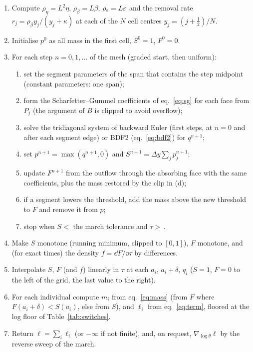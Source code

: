 \begin{enumerate}[leftmargin=2em,itemsep=1pt]
  \item Compute $\rho_\eta=L^2\eta$, $\rho_\beta=L\beta$, $\rho_\varepsilon=L\varepsilon$ and the removal rate $r_j=\rho_\beta y_j/(y_j+\kappa)$ at each of the $N$ cell centres $y_j=(j+\tfrac12)/N$.
  \item Initialise $p^0$ as all mass in the first cell, $S^0=1$, $F^0=0$.
  \item For each step $n=0,1,\dots$ of the mesh (graded start, then uniform):
  \begin{enumerate}[label=(\alph*),leftmargin=1.6em,itemsep=0pt]
    \item set the segment parameters of the span that contains the step midpoint (constant parameters: one span);
    \item form the Scharfetter--Gummel coefficients of eq.~\eqref{eq:sg} for each face from $P_j$ (the argument of $B$ is clipped to avoid overflow);
    \item solve the tridiagonal system of backward Euler (first steps, at $n=0$ and after each segment edge) or BDF2 (eq.~\eqref{eq:bdf2}) for $q^{n+1}$;
    \item set $p^{n+1}=\max(q^{n+1},0)$ and $S^{n+1}=\Delta y\sum_jp^{n+1}_j$;
    \item update $F^{n+1}$ from the outflow through the absorbing face with the same coefficients, plus the mass restored by the clip in (d);
    \item if a segment lowers the threshold, add the mass above the new threshold to $F$ and remove it from $p$;
    \item stop when $S<$ the march tolerance and $\tau>$\,.
  \end{enumerate}
  \item Make $S$ monotone (running minimum, clipped to $[0,1]$), $F$ monotone, and (for exact times) the density $f=\dd F/\dd\tau$ by differences.
  \item Interpolate $S$, $F$ (and $f$) linearly in $\tau$ at each $a_i$, $a_i+\delta$, $q_i$ ($S=1$, $F=0$ to the left of the grid, the last value to the right).
  \item For each individual compute $m_i$ from eq.~\eqref{eq:mass} (from $F$ where $F(a_i+\delta)<S(a_i)$, else from $S$), and $\ell_i$ from eq.~\eqref{eq:term}, floored at the log floor of Table~\ref{tab:switches}.
  \item Return $\ell=\sum_i\ell_i$ (or $-\infty$ if not finite), and, on request, $\nabla_{\log\theta}\ell$ by the reverse sweep of the march.
\end{enumerate}

